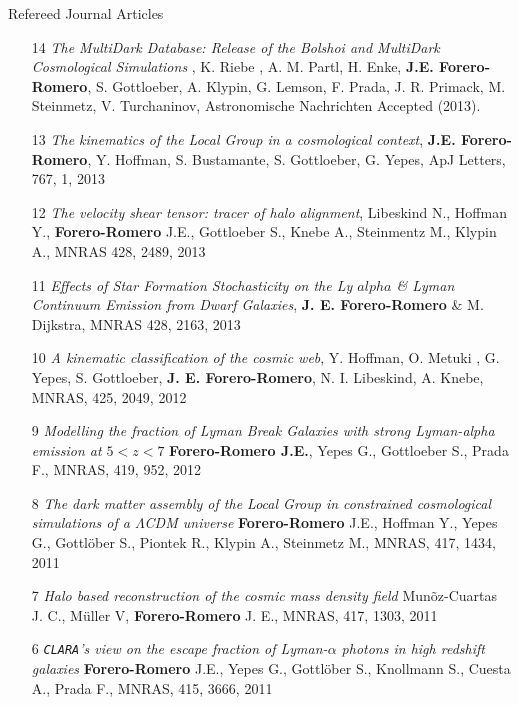 \documentclass[9pt]{article}
\begin{document}
Refereed Journal Articles
\begin{enumerate}

\item[14]{\it The MultiDark Database: Release of the Bolshoi and MultiDark Cosmological Simulations} , K. Riebe , A. M. Partl, H. Enke, {\bf J.E. Forero-Romero}, S. Gottloeber, A. Klypin, G. Lemson, F. Prada, J. R. Primack, M. Steinmetz, V. Turchaninov, Astronomische Nachrichten Accepted (2013).

\item[13] {\it The kinematics of the Local Group in a cosmological context}, 
{\bf J.E. Forero-Romero}, Y. Hoffman, S. Bustamante, S. Gottloeber, G. Yepes, ApJ Letters, 767, 1, 2013


\item[12] {\it The velocity shear tensor: tracer of halo alignment}, Libeskind N., Hoffman Y., {\bf Forero-Romero} J.E., Gottloeber S., Knebe A., Steinmentz M., Klypin A., MNRAS 428, 2489, 2013

\item[11] {\it Effects of Star Formation Stochasticity on the Ly $alpha$ \& Lyman Continuum Emission from Dwarf Galaxies}, {\bf J. E. Forero-Romero} \& M. Dijkstra, MNRAS 428, 2163, 2013

\item[10] {\it A kinematic classification of the cosmic web}, Y. Hoffman, O. Metuki , G. Yepes, S. Gottloeber, {\bf J. E. Forero-Romero}, N. I. Libeskind, A. Knebe, MNRAS, 425, 2049, 2012

\item[9] {\it Modelling the fraction of Lyman Break Galaxies with strong Lyman-alpha emission at $5 < z < 7$} {\bf Forero-Romero J.E.}, Yepes G., Gottloeber S., Prada F., MNRAS, 419, 952, 2012

\item [8]
{\it The dark matter assembly of the Local Group in constrained cosmological
  simulations of a $\Lambda$CDM universe} {\bf Forero-Romero} J.E., Hoffman Y., Yepes G., Gottl\"ober S.,
  Piontek R., Klypin A., Steinmetz M., 
MNRAS, 417, 1434, 2011

\item[7] 
{\it Halo based reconstruction of the cosmic mass density field}
Mun\~oz-Cuartas J. C., M\"uller V, {\bf Forero-Romero} J. E.,
MNRAS, 417, 1303, 2011

\item [6]
{\it {\tt CLARA}'s view on the escape fraction of Lyman-$\alpha$ photons in
  high redshift galaxies}
{\bf Forero-Romero} J.E., Yepes G., Gottl\"ober S., Knollmann S., Cuesta A., Prada F.,  
MNRAS, 415, 3666, 2011


\end{enumerate}
\end{document}
